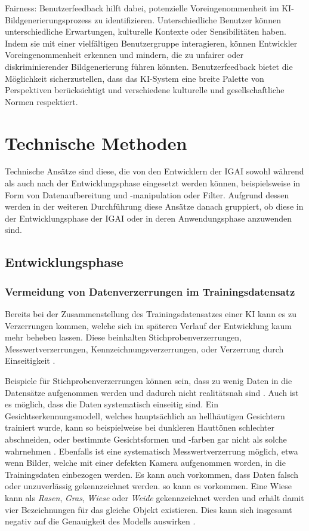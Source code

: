 \documentclass[12pt]{article}
\begin{document}
Fairness: Benutzerfeedback hilft dabei, potenzielle Voreingenommenheit im KI-Bildgenerierungsprozess zu identifizieren. Unterschiedliche Benutzer können unterschiedliche Erwartungen, kulturelle Kontexte oder Sensibilitäten haben. Indem sie mit einer vielfältigen Benutzergruppe interagieren, können Entwickler Voreingenommenheit erkennen und mindern, die zu unfairer oder diskriminierender Bildgenerierung führen könnten. Benutzerfeedback bietet die Möglichkeit sicherzustellen, dass das KI-System eine breite Palette von Perspektiven berücksichtigt und verschiedene kulturelle und gesellschaftliche Normen respektiert.

\section{Technische Methoden}

Technische Ansätze sind diese, die von den Entwicklern der IGAI sowohl während als auch nach der Entwicklungsphase eingesetzt werden können, beispielsweise in Form von Datenaufbereitung und -manipulation oder Filter. 
Aufgrund dessen werden in der weiteren Durchführung diese Ansätze danach gruppiert, ob diese in der Entwicklungsphase der IGAI oder in deren Anwendungsphase anzuwenden sind.

\subsection{Entwicklungsphase}
\subsubsection{Vermeidung von Datenverzerrungen im Trainingsdatensatz}
Bereits bei der Zusammenstellung des Trainingsdatensatzes einer KI kann es zu Verzerrungen kommen, welche sich im späteren Verlauf der Entwicklung kaum mehr beheben lassen.
Diese beinhalten Stichprobenverzerrungen, Messwertverzerrungen, Kennzeichnungsverzerrungen, oder Verzerrung durch Einseitigkeit \cite{Srinivasan}.

Beispiele für Stichprobenverzerrungen können sein, dass zu wenig Daten in die Datensätze aufgenommen werden und dadurch nicht realitätsnah sind \cite{Srinivasan}.
Auch ist es möglich, dass die Daten systematisch einseitig sind. Ein Gesichtserkennungsmodell, welches hauptsächlich an hellhäutigen Gesichtern trainiert wurde,
kann so beispielweise bei dunkleren Hauttönen schlechter abschneiden, oder bestimmte Gesichtsformen und -farben gar nicht als solche wahrnehmen \cite{Srinivasan}.
Ebenfalls ist eine systematisch Messwertverzerrung möglich, etwa wenn Bilder, welche mit einer defekten Kamera aufgenommen worden, in die Trainingsdaten einbezogen werden.
Es kann auch vorkommen, dass Daten falsch oder unzuverlässig gekennzeichnet werden. so kann es vorkommen. Eine Wiese kann als \textit{Rasen}, \textit{Gras}, \textit{Wiese} oder \textit{Weide} gekennzeichnet werden und erhält damit vier Bezeichnungen für das gleiche Objekt existieren. Dies kann sich insgesamt negativ auf die Genauigkeit des Modells auswirken \cite{Srinivasan}.
\end{document}
